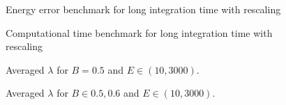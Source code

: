 \documentclass{beamer}
\begin{document}

\begin{frame}
	\begin{figure}
		
		\caption{Energy error benchmark for long integration time with rescaling}
	\end{figure}
\end{frame}


\begin{frame}
	\begin{figure}
		
		\caption{Computational time benchmark for long integration time with rescaling}
	\end{figure}
\end{frame}


\begin{frame}
	\begin{figure}
		
		\caption{Averaged \(\lambda\) for \(B=0.5\) and \(E \in (10, 3000)\).}
	\end{figure}
\end{frame}


\begin{frame}
	\begin{figure}
		
		\caption{Averaged \(\lambda\) for \(B \in {0.5,0.6}\) and \(E \in (10, 3000)\).}
	\end{figure}
\end{frame}
\end{document}
